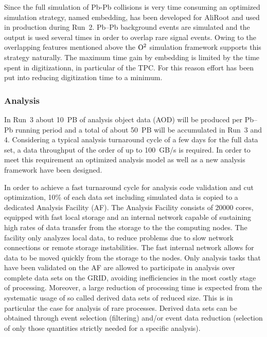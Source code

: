 Since the full simulation of Pb-Pb collisions is very time consuming an optimized
simulation strategy, named embedding, has been developed for AliRoot and used in
production during Run~2. Pb--Pb background events are simulated and the output is
used several times in order to overlap rare signal events. Owing to the overlapping features
mentioned above the ${\rm O}^2$ simulation framework supports this strategy naturally. The maximum time gain by embedding is limited by the time spent in digitizationn, in particular of the TPC.
For this reason effort has been put into reducing digitization time to a minimum.

\subsubsection{Analysis}
In Run~3 about 10~PB of analysis object data (AOD) will be produced per Pb--Pb running period and
a total of about 50~PB will be accumulated in Run~3 and 4. Considering a typical analysis
turnaround cycle of a few days for the full data set, a data throughput of the order of up to
100~GB/s is required. In order to meet this requirement an optimized analysis model as well as a
new analysis framework have been designed.

In order to achieve a fast turnaround cycle for analysis code validation and cut
optimization, 10\% of each data set including simulated data is copied to a
dedicated Analysis Facility (AF). The Analysis Facility consists of 20000 cores,
equipped with fast local storage and an internal network capable of sustaining
high rates of data transfer from the storage to the the computing nodes. The
facility only analyzes local data, to reduce problems due to slow network
connections or remote storage instabilities. The fast internal network allows for
data to be moved quickly from the storage to the nodes. Only analysis tasks that
have been validated on the AF are allowed to participate in analysis over complete data
sets on the GRID, avoiding inefficiencies in the most costly stage of processing.
Moreover, a large reduction of processing time is expected from the systematic
usage of so called derived data sets of reduced size. This is in particular the
case for analysis of rare processes.
Derived data sets can be obtained through event selection (filtering) and/or event
data reduction (selection of only those quantities strictly needed for a specific analysis).

